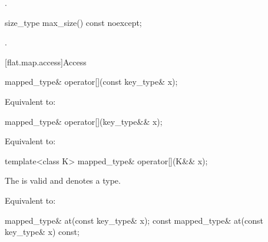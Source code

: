 \begin{itemdescr}
\pnum
\returns
{}.
\end{itemdescr}

%
\begin{itemdecl}
size_type max_size() const noexcept;
\end{itemdecl}

\begin{itemdescr}
\pnum
\returns
{}.
\end{itemdescr}

[flat.map.access]{Access}

%
\begin{itemdecl}
mapped_type& operator[](const key_type& x);
\end{itemdecl}

\begin{itemdescr}
\pnum
\effects
Equivalent to: 
\end{itemdescr}

%
\begin{itemdecl}
mapped_type& operator[](key_type&& x);
\end{itemdecl}

\begin{itemdescr}
\pnum
\effects
Equivalent to: 
\end{itemdescr}

%
\begin{itemdecl}
template<class K> mapped_type& operator[](K&& x);
\end{itemdecl}

\begin{itemdescr}
\pnum
\constraints
The   is valid and
denotes a type.

\pnum
\effects
Equivalent to: 
\end{itemdescr}

%
\begin{itemdecl}
mapped_type&       at(const key_type& x);
const mapped_type& at(const key_type& x) const;
\end{itemdecl}

